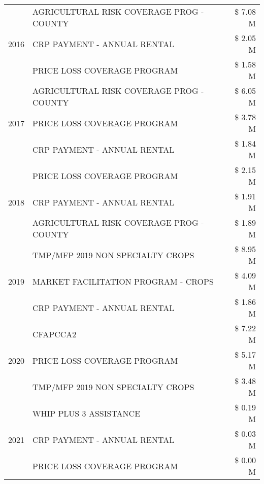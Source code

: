 \begin{tabular}{llr}
\cline{1-3}
\multirow[t]{3}{*}{2016} & AGRICULTURAL RISK COVERAGE PROG - COUNTY & \$ 7.08 M \\
 & CRP PAYMENT - ANNUAL RENTAL & \$ 2.05 M \\
 & PRICE LOSS COVERAGE PROGRAM & \$ 1.58 M \\
\cline{1-3}
\multirow[t]{3}{*}{2017} & AGRICULTURAL RISK COVERAGE PROG - COUNTY & \$ 6.05 M \\
 & PRICE LOSS COVERAGE PROGRAM & \$ 3.78 M \\
 & CRP PAYMENT - ANNUAL RENTAL & \$ 1.84 M \\
\cline{1-3}
\multirow[t]{3}{*}{2018} & PRICE LOSS COVERAGE PROGRAM & \$ 2.15 M \\
 & CRP PAYMENT - ANNUAL RENTAL & \$ 1.91 M \\
 & AGRICULTURAL RISK COVERAGE PROG - COUNTY & \$ 1.89 M \\
\cline{1-3}
\multirow[t]{3}{*}{2019} & TMP/MFP 2019 NON SPECIALTY CROPS & \$ 8.95 M \\
 & MARKET FACILITATION PROGRAM - CROPS & \$ 4.09 M \\
 & CRP PAYMENT - ANNUAL RENTAL & \$ 1.86 M \\
\cline{1-3}
\multirow[t]{3}{*}{2020} & CFAPCCA2 & \$ 7.22 M \\
 & PRICE LOSS COVERAGE PROGRAM & \$ 5.17 M \\
 & TMP/MFP 2019 NON SPECIALTY CROPS & \$ 3.48 M \\
\cline{1-3}
\multirow[t]{3}{*}{2021} & WHIP PLUS 3 ASSISTANCE & \$ 0.19 M \\
 & CRP PAYMENT - ANNUAL RENTAL & \$ 0.03 M \\
 & PRICE LOSS COVERAGE PROGRAM & \$ 0.00 M \\
\cline{1-3}
\bottomrule
\end{tabular}
